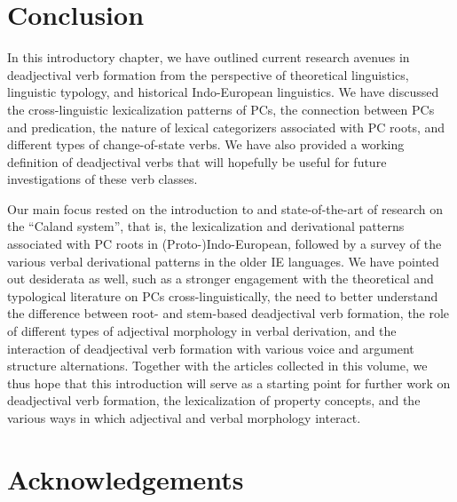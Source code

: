 \documentclass[output=paper,colorlinks,citecolor=brown]{langscibook}
\begin{document}
\section{Conclusion}

In this introductory chapter, we have outlined current research avenues in deadjectival verb formation from the perspective of theoretical linguistics, linguistic typology, and historical Indo-European linguistics. We have discussed the cross-linguistic lexicalization patterns of PCs, the connection between PCs and  predication, the nature of lexical categorizers associated with PC roots, and different types of change-of-state verbs. We have also provided a working definition of deadjectival verbs that will hopefully be useful for future investigations of these verb classes. 

Our main focus rested on the introduction to and state-of-the-art of research on the ``Caland system'',  that is, the lexicalization and derivational patterns associated with PC roots in (Proto-)Indo-European, followed by a survey of the various verbal derivational patterns in the older IE languages. We have pointed out desiderata as well, such as a stronger engagement with the theoretical and typological literature on PCs cross-linguistically, the need to better understand the difference between root- and stem-based deadjectival verb formation, the role of different types of adjectival morphology in verbal derivation, and the interaction of deadjectival verb formation with various voice and argument structure alternations. Together with the articles collected in this volume, we thus hope that this introduction will serve as a starting point for further work on deadjectival verb formation, the lexicalization of property concepts, and the various ways in which adjectival and verbal morphology interact.  



\section*{Acknowledgements}
\end{document}
